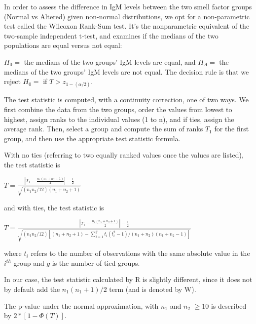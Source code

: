 \documentclass[
]{article}
\newenvironment{Shaded}{\begin{snugshade}}{\end{snugshade}}
\newcommand{\DataTypeTok}[1]{\textcolor[rgb]{0.13,0.29,0.53}{#1}}
\newcommand{\DecValTok}[1]{\textcolor[rgb]{0.00,0.00,0.81}{#1}}
\newcommand{\KeywordTok}[1]{\textcolor[rgb]{0.13,0.29,0.53}{\textbf{#1}}}
\newcommand{\NormalTok}[1]{#1}
\newcommand{\OperatorTok}[1]{\textcolor[rgb]{0.81,0.36,0.00}{\textbf{#1}}}
\newcommand{\StringTok}[1]{\textcolor[rgb]{0.31,0.60,0.02}{#1}}
\begin{document}
In order to assess the difference in IgM levels between the two smell
factor groups (Normal vs Altered) given non-normal distributions, we opt
for a non-parametric test called the Wilcoxon Rank-Sum test. It's the
nonparametric equivalent of the two-sample independent t-test, and
examines if the medians of the two populations are equal versus not
equal:

\(H_0 =\) the medians of the two groups' IgM levels are equal, and
\(H_A =\) the medians of the two groups' IgM levels are not equal. The
decision rule is that we reject \(H_0 =\) if \(T > z_{1-(\alpha/2)}\).

The test statistic is computed, with a continuity correction, one of two
ways. We first combine the data from the two groups, order the values
from lowest to highest, assign ranks to the individual values (1 to n),
and if ties, assign the average rank. Then, select a group and compute
the sum of ranks \(T_1\) for the first group, and then use the
appropriate test statistic formula.

With no ties (referring to two equally ranked values once the values are
listed), the test statistic is

\(T=\frac{\left|T_{1}-\frac{n_{1}\left(n_{1}+n_{2}+1\right)}{2}\right|-\frac{1}{2}}{\sqrt{\left(n_{1} n_{2} / 12\right)\left(n_{1}+n_{2}+1\right)}}\)

and with ties, the test statistic is

\(T=\frac{\left|T_{1}-\frac{n_{1}\left(n_{1}+n_{2}+1\right)}{2}\right|-\frac{1}{2}}{\sqrt{\left(n_{1} n_{2} / 12\right)\left[\left(n_{1}+n_{2}+1\right)-\sum_{i=1}^{g} t_{i}\left(t_{i}^{2}-1\right) /\left(n_{1}+n_{2}\right)\left(n_{1}+n_{2}-1\right)\right]}}\)

where \(t_i\) refers to the number of observations with the same
absolute value in the \(i^{th}\) group and \(g\) is the number of tied
groups.

In our case, the test statistic calculated by R is slightly different,
since it does not by default add the \(n_1(n_1+1)/2\) term (and is
denoted by W).

The p-value under the normal approximation, with \(n_1\) and \(n_2\)
\(\geq 10\) is described by \(2 * [1 -\Phi(T)]\).

\begin{Shaded}
\end{Shaded}
\end{document}

